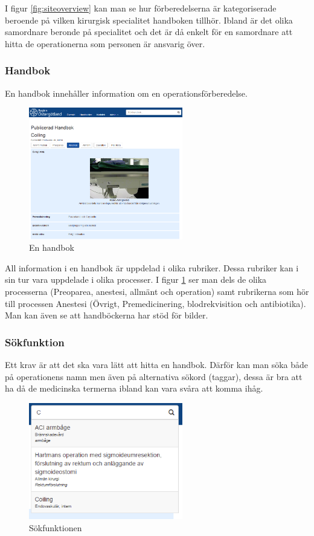 I figur \ref{fig:siteoverview} kan man se hur förberedelserna är kategoriserade beroende på vilken kirurgisk specialitet handboken tillhör.
Ibland är det olika samordnare beronde på specialitet och det är då enkelt för en samordnare att hitta de operationerna som personen är ansvarig över.

\subsubsection{Handbok}
En handbok innehåller information om en operationsförberedelse.

\begin{figure}
  \centering
  \includegraphics[width=0.6\textwidth]{images/site/handbok.png}
  \caption{En handbok}
  \label{fig:handbok}
\end{figure}

All information i en handbok är uppdelad i olika rubriker. Dessa rubriker kan i sin tur vara uppdelade i olika processer.
I figur \ref{fig:handbok} ser man dels de olika processerna (Preoparea, anestesi, allmänt och operation) samt rubrikerna som hör till processen Anestesi (Övrigt, Premedicinering, blodrekvisition och  antibiotika).
Man kan även se att handböckerna har stöd för bilder.

\subsubsection{Sökfunktion}
Ett krav är att det ska vara lätt att hitta en handbok.
Därför kan man söka både på operationens namn men även på alternativa sökord (taggar), dessa är bra att ha då de medicinska termerna ibland kan vara svåra att komma ihåg.

\begin{figure}
  \centering
  \includegraphics[width=0.6\textwidth]{images/site/search}
  \caption{Sökfunktionen}
  \label{fig:search}
\end{figure}

